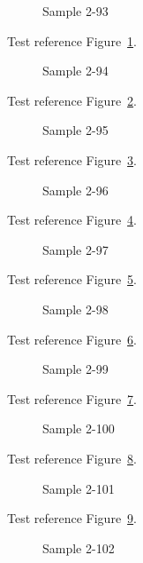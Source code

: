 \begin{figure}[tbhp]
\caption{Sample 2-93}
\label{fig:sample-2-93}
\end{figure}

Test reference Figure~\ref{fig:sample-2-93}.

\begin{figure}[tbhp]
\caption{Sample 2-94}
\label{fig:sample-2-94}
\end{figure}

Test reference Figure~\ref{fig:sample-2-94}.

\begin{figure}[tbhp]
\caption{Sample 2-95}
\label{fig:sample-2-95}
\end{figure}

Test reference Figure~\ref{fig:sample-2-95}.

\begin{figure}[tbhp]
\caption{Sample 2-96}
\label{fig:sample-2-96}
\end{figure}

Test reference Figure~\ref{fig:sample-2-96}.

\begin{figure}[tbhp]
\caption{Sample 2-97}
\label{fig:sample-2-97}
\end{figure}

Test reference Figure~\ref{fig:sample-2-97}.

\begin{figure}[tbhp]
\caption{Sample 2-98}
\label{fig:sample-2-98}
\end{figure}

Test reference Figure~\ref{fig:sample-2-98}.

\begin{figure}[tbhp]
\caption{Sample 2-99}
\label{fig:sample-2-99}
\end{figure}

Test reference Figure~\ref{fig:sample-2-99}.

\begin{figure}[tbhp]
\caption{Sample 2-100}
\label{fig:sample-2-100}
\end{figure}

Test reference Figure~\ref{fig:sample-2-100}.

\begin{figure}[tbhp]
\caption{Sample 2-101}
\label{fig:sample-2-101}
\end{figure}

Test reference Figure~\ref{fig:sample-2-101}.

\begin{figure}[tbhp]
\caption{Sample 2-102}
\label{fig:sample-2-102}
\end{figure}

